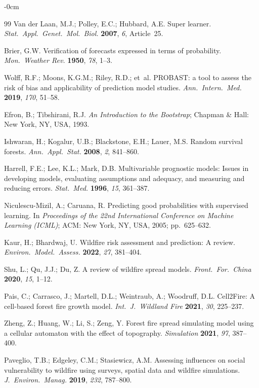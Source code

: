 \documentclass[fire,article,submit,pdftex]{../Definitions/mdpi}
\begin{document}
\begin{adjustwidth}{-\extralength}{0cm}
\begin{thebibliography}{99}
Van der Laan, M.J.; Polley, E.C.; Hubbard, A.E.
Super learner.
\textit{Stat.\ Appl.\ Genet.\ Mol.\ Biol.} \textbf{2007}, \textit{6}, Article~25.

Brier, G.W.
Verification of forecasts expressed in terms of probability.
\textit{Mon.\ Weather Rev.} \textbf{1950}, \textit{78}, 1--3.

Wolff, R.F.; Moons, K.G.M.; Riley, R.D.; et~al.
PROBAST: a tool to assess the risk of bias and applicability of prediction model studies.
\textit{Ann.\ Intern.\ Med.} \textbf{2019}, \textit{170}, 51--58.

Efron, B.; Tibshirani, R.J.
\textit{An Introduction to the Bootstrap};
Chapman \& Hall: New York, NY, USA, 1993.

Ishwaran, H.; Kogalur, U.B.; Blackstone, E.H.; Lauer, M.S.
Random survival forests.
\textit{Ann.\ Appl.\ Stat.} \textbf{2008}, \textit{2}, 841--860.

Harrell, F.E.; Lee, K.L.; Mark, D.B.
Multivariable prognostic models: Issues in developing models, evaluating assumptions and adequacy, and measuring and reducing errors.
\textit{Stat.\ Med.} \textbf{1996}, \textit{15}, 361--387.

Niculescu-Mizil, A.; Caruana, R.
Predicting good probabilities with supervised learning.
In \textit{Proceedings of the 22nd International Conference on Machine Learning (ICML)};
ACM: New York, NY, USA, 2005; pp.~625--632.

Kaur, H.; Bhardwaj, U.
Wildfire risk assessment and prediction: A review.
\textit{Environ.\ Model.\ Assess.} \textbf{2022}, \textit{27}, 381--404.

Shu, L.; Qu, J.J.; Du, Z.
A review of wildfire spread models.
\textit{Front.\ For.\ China} \textbf{2020}, \textit{15}, 1--12.

Pais, C.; Carrasco, J.; Martell, D.L.; Weintraub, A.; Woodruff, D.L.
Cell2Fire: A cell-based forest fire growth model.
\textit{Int.\ J.\ Wildland Fire} \textbf{2021}, \textit{30}, 225--237.

Zheng, Z.; Huang, W.; Li, S.; Zeng, Y.
Forest fire spread simulating model using a cellular automaton with the effect of topography.
\textit{Simulation} \textbf{2021}, \textit{97}, 387--400.

Paveglio, T.B.; Edgeley, C.M.; Stasiewicz, A.M.
Assessing influences on social vulnerability to wildfire using surveys, spatial data and wildfire simulations.
\textit{J.\ Environ.\ Manag.} \textbf{2019}, \textit{232}, 787--800.


\end{thebibliography}
\end{adjustwidth}
\end{document}
